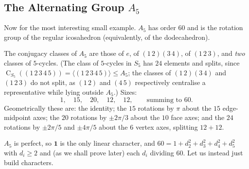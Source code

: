 \documentclass[a4paper]{scrartcl}
\newcommand{\Cent}{\operatorname{C}}
\newcommand{\gen}[1]{\langle #1 \rangle}
\begin{document}
\subsection{The Alternating Group \texorpdfstring{$A_5$}{A5}}

Now for the most interesting small example. $A_5$ has order $60$ and is the rotation group of the regular icosahedron (equivalently, of the dodecahedron).

\begin{center}
\end{center}

The conjugacy classes of $A_5$ are those of $e$, of $(1\,2)(3\,4)$, of $(1\,2\,3)$, and \emph{two} classes of $5$-cycles. (The class of $5$-cycles in $S_5$ has $24$ elements and splits, since $\Cent_{S_5}((1\,2\,3\,4\,5)) = \gen{(1\,2\,3\,4\,5)}\leq A_5$; the classes of $(1\,2)(3\,4)$ and $(1\,2\,3)$ do not split, as $(1\,2)$ and $(4\,5)$ respectively centralise a representative while lying outside $A_5$.) Sizes:
$$1,\quad 15,\quad 20,\quad 12,\quad 12, \qquad \text{summing to } 60.$$
Geometrically these are: the identity; the $15$ rotations by $\pi$ about the $15$ edge-midpoint axes; the $20$ rotations by $\pm2\pi/3$ about the $10$ face axes; and the $24$ rotations by $\pm2\pi/5$ and $\pm4\pi/5$ about the $6$ vertex axes, splitting $12+12$.

$A_5$ is perfect, so $\mathbf 1$ is the only linear character, and $60 = 1 + d_2^2+d_3^2+d_4^2+d_5^2$ with $d_i\geq 2$ and (as we shall prove later) each $d_i$ dividing $60$. Let us instead just build characters.
\end{document}
